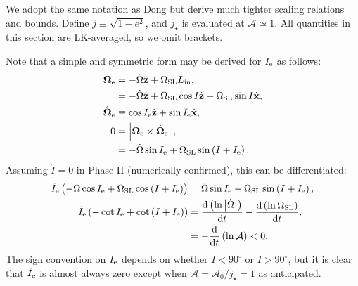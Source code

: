 \documentclass[11pt,
        usenames, %
        dvipsnames %
    ]{article}
\newcommand*{\rd}[2]{\frac{\mathrm{d}#1}{\mathrm{d}#2}}
\newcommand*{\bm}[1]{\boldsymbol{\mathbf{#1}}}
\newcommand*{\uv}[1]{\hat{\bm{#1}}}
\newcommand*{\abs}[1]{\left|#1\right|}
\newcommand*{\p}[1]{\left(#1\right)}
\begin{document}
We adopt the same notation as Dong but derive much tighter scaling relations and
bounds. Define $j \equiv \sqrt{1 - e^2}$, and $j_\star$ is evaluated at
$\mathcal{A} \simeq 1$. All quantities in this section are LK-averaged, so we
omit brackets.

Note that a simple and symmetric form may be derived for $I_{\rm e}$ as follows:
\begin{align}
    \bm{\Omega}_{\rm e} &= -\dot{\Omega} \uv{z} + \Omega_{\rm SL}
            L_{\rm in},\\
        &= -\dot{\Omega} \uv{z} + \Omega_{\rm SL}\cos I \uv{z}
            + \Omega_{\rm SL} \sin I \uv{x},\\
    \uv{\Omega}_{\rm e} &\equiv \cos I_{\rm e} \uv{z}
        + \sin I_{\rm e} \uv{x},\\
    0 &= \abs{\bm{\Omega}_{\rm e} \times \uv{\Omega}_{\rm e}},\\
        &= -\dot{\Omega} \sin I_{\rm e} + \Omega_{\rm SL}\sin
            \p{I + I_{\rm e}}.
\end{align}
Assuming $\dot{I} = 0$ in Phase II (numerically confirmed), this can be
differentiated:
\begin{align}
    \dot{I}_{\rm e}\p{-\dot{\Omega} \cos I_{\rm e}
            + \Omega_{\rm SL} \cos \p{I + I_{\rm e}}}
        &= \ddot{\Omega} \sin I_{\rm e} - \dot{\Omega}_{\rm SL} \sin
            \p{I + I_{\rm e}},\\
    \dot{I}_{\rm e}\p{-\cot I_{\rm e} + \cot \p{I + I_{\rm e}}}
        &= \rd{\p{\ln \abs{\dot{\Omega}}}}{t}
            - \rd{\p{\ln \Omega_{\rm SL}}}{t},\\
        &= -\rd{}{t}\p{\ln \mathcal{A}} < 0.
\end{align}
The sign convention on $I_{\rm e}$ depends on whether $I < 90^\circ$ or $I >
90^\circ$, but it is clear that $\dot{I}_{\rm e}$ is almost always zero except
when $\mathcal{A} = \mathcal{A}_0 / j_{\star} = 1$ as anticipated.
\end{document}
